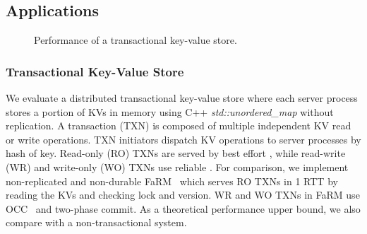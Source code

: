 \subsection{Applications}
\label{sec:application}


\begin{figure}[t]
	\centering
	\hspace{0.01\textwidth}
	\hspace{0.01\textwidth}
	\caption{Performance of a transactional key-value store.}
	\vspace{-15pt}
\end{figure}


\subsubsection{Transactional Key-Value Store}
\label{subsec:eval-kvs}


We evaluate a distributed transactional key-value store where each server process stores a portion of KVs in memory using C++ \textit{std::unordered\_map} without replication.
A transaction (TXN) is composed of multiple independent KV read or write operations.
TXN initiators dispatch KV operations to server processes by hash of key.
Read-only (RO) TXNs are served by best effort \sys{}, while read-write (WR) and write-only (WO) TXNs use reliable \sys{}.
For comparison, we implement non-replicated and non-durable FaRM~\cite{dragojevic2014farm} which serves RO TXNs in 1 RTT by reading the KVs and checking lock and version. WR and WO TXNs in FaRM use OCC~\cite{kung1981optimistic} and two-phase commit.
As a theoretical performance upper bound, we also compare with a non-transactional system.

